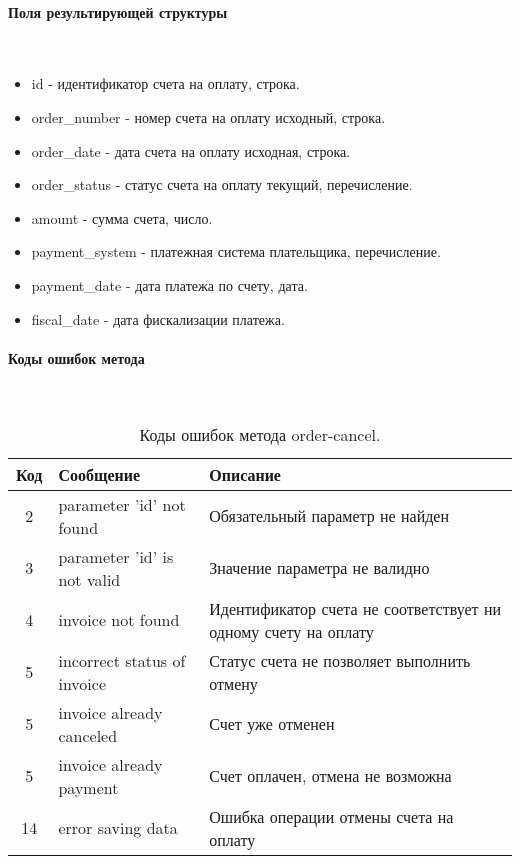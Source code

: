 \documentclass[11pt, a4paper]{article}
\begin{document}
\paragraph{Поля результирующей структуры}\

\begin{itemize}
	\item id - идентификатор счета на оплату, строка.
	\item order\_number - номер счета на оплату исходный, строка.
	\item order\_date - дата счета на оплату исходная, строка.
	\item order\_status - статус счета на оплату текущий, перечисление.
	\item amount - сумма счета, число.
	\item payment\_system - платежная система плательщика, перечисление.
	\item payment\_date - дата платежа по счету, дата.
	\item fiscal\_date - дата фискализации платежа.
\end{itemize}

\paragraph{Коды ошибок метода}\

\begin{table}[H]
	\centering
	
	\begin{tabular}{| c | p{6cm} | p{9cm} |}
		\hline
		Код & Сообщение & Описание \\
		\hline
		2 & parameter 'id' not found & Обязательный параметр не найден \\
		3 & parameter 'id' is not valid & Значение параметра не валидно \\
		4 & invoice not found & Идентификатор счета не соответствует ни одному счету на оплату \\
		5 & incorrect status of invoice & Статус счета не позволяет выполнить отмену \\
		5 & invoice already canceled & Счет уже отменен \\
		5 & invoice already payment & Счет оплачен, отмена не возможна \\
		14 & error saving data & Ошибка операции отмены счета на оплату \\
		\hline
	\end{tabular}
	\caption{Коды ошибок метода order-cancel.}
\end{table}
\end{document}
